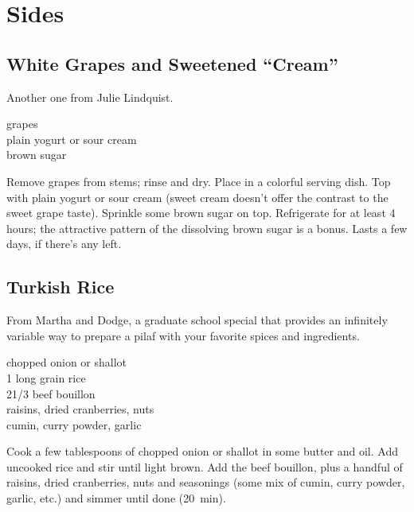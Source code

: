 \chapter{Sides}

\section{White Grapes and Sweetened ``Cream''}

\begin{open}
Another one from Julie Lindquist.
\end{open}
\begin{ingredients}
    grapes\\
    plain yogurt or sour cream\\
    brown sugar\\
\end{ingredients}
Remove grapes from stems; rinse and dry. Place in a colorful serving dish. Top with plain yogurt or sour cream (sweet cream doesn't offer the contrast to the sweet grape taste). Sprinkle some brown sugar on top. Refrigerate for at least 4 hours; the attractive pattern of the dissolving brown sugar is a bonus. Lasts a few days, if there’s any left.

\section{Turkish Rice}

\begin{open}
    From Martha and Dodge, a graduate school special that provides an infinitely
    variable way to prepare a pilaf with your favorite spices and ingredients.
\end{open}
\begin{ingredients}
    chopped onion or shallot\\
    \SI{1}{\cup} long grain rice\\
    2\SI{1/3}{\cup} beef bouillon\\
    raisins, dried cranberries, nuts\\
    cumin, curry powder, garlic\\
\end{ingredients}
Cook a few tablespoons of chopped onion or shallot in some butter and oil. Add
uncooked rice and stir until light brown. Add the beef bouillon, plus a handful
of raisins, dried cranberries, nuts and seasonings (some mix of cumin, curry
powder, garlic, etc.) and simmer until done (\SI{20}{\minute}).


